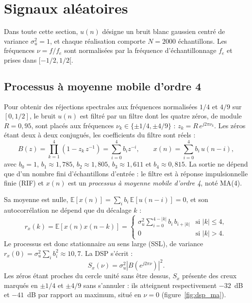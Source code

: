 \documentclass[11pt,a4paper]{article}
\begin{document}
\section{Signaux aléatoires}
\label{sec:signaux}

Dans toute cette section, $u(n)$ désigne un bruit blanc gaussien centré de variance $\sigma_u^2 = 1$, et chaque réalisation comporte $N = 2000$ échantillons. Les fréquences $\nu = f/f_e$ sont normalisées par la fréquence d'échantillonnage $f_e$ et prises dans $[-1/2, 1/2[$.

\subsection{Processus à moyenne mobile d'ordre 4}

Pour obtenir des réjections spectrales aux fréquences normalisées $1/4$ et $4/9$ sur $[0, 1/2]$, le bruit $u(n)$ est filtré par un filtre dont les quatre zéros, de module $R = 0{,}95$, sont placés aux fréquences $\nu_k \in \{\pm 1/4, \pm 4/9\}$ : $z_k = R\, e^{j2\pi\nu_k}$. Les zéros étant deux à deux conjugués, les coefficients du filtre sont réels :
\begin{equation}
  B(z) = \prod_{k=1}^{4} \left( 1 - z_k\, z^{-1} \right) = \sum_{i=0}^{4} b_i z^{-i},
  \qquad
  x(n) = \sum_{i=0}^{4} b_i\, u(n-i),
  \label{eq:ma4}
\end{equation}
avec $b_0 = 1$, $b_1 \approx 1{,}785$, $b_2 \approx 1{,}805$, $b_3 \approx 1{,}611$ et $b_4 \approx 0{,}815$. La sortie ne dépend que d'un nombre fini d'échantillons d'entrée : le filtre est à réponse impulsionnelle finie (RIF) et $x(n)$ est un \emph{processus à moyenne mobile d'ordre 4}, noté MA(4).

Sa moyenne est nulle, $\mathbb{E}[x(n)] = \sum_i b_i\, \mathbb{E}[u(n-i)] = 0$, et son autocorrélation ne dépend que du décalage $k$ :
\begin{equation}
  r_x(k) = \mathbb{E}[x(n)x(n-k)] =
  \begin{cases}
    \sigma_u^2 \displaystyle\sum_{i=0}^{4-|k|} b_i\, b_{i+|k|} & \text{si } |k| \leq 4,\\[2mm]
    0 & \text{si } |k| > 4.
  \end{cases}
  \label{eq:r_ma}
\end{equation}
Le processus est donc stationnaire au sens large (SSL), de variance $r_x(0) = \sigma_u^2 \sum_i b_i^2 \approx 10{,}7$. La DSP s'écrit :
\begin{equation}
  S_x(\nu) = \sigma_u^2 \left| B\!\left(e^{j2\pi\nu}\right) \right|^2.
  \label{eq:dsp_ma}
\end{equation}
Les zéros étant proches du cercle unité sans être dessus, $S_x$ présente des creux marqués en $\pm 1/4$ et $\pm 4/9$ sans s'annuler : ils atteignent respectivement $-32$~dB et $-41$~dB par rapport au maximum, situé en $\nu = 0$ (figure~\ref{fig:dsp_ma}).
\end{document}
